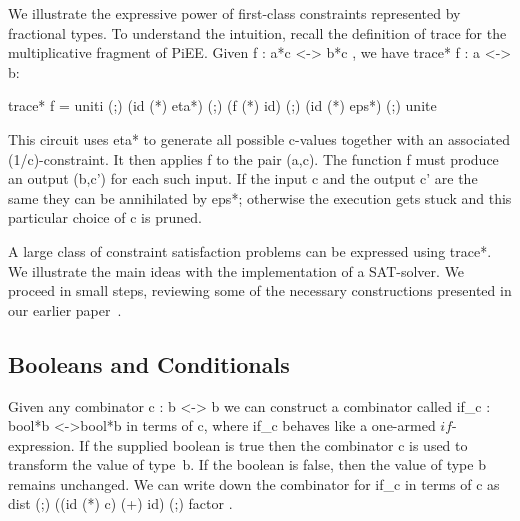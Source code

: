 \documentclass[preprint]{sigplanconf}
\begin{document}
We illustrate the expressive power of first-class constraints represented by
fractional types. To understand the intuition, recall the definition of
{{trace}} for the multiplicative fragment of {{PiEE}}. 
Given {{f : a*c <-> b*c }}, we have {{trace* f : a <-> b}}: 

{{ trace* f = uniti (;) (id (*) eta*) (;) (f (*) id) (;) (id (*) eps*) (;) unite }}

\noindent This circuit uses {{eta*}} to generate all possible {{c}}-values
together with an associated {{(1/c)}}-constraint. It then applies {{f}} to the
pair {{(a,c)}}. The function {{f}} must produce an output {{(b,c')}} for each
such input. If the input {{c}} and the output {{c'}} are the same they can be
annihilated by {{eps*}}; otherwise the execution gets stuck and this
particular choice of {{c}} is pruned. 


A large class of constraint satisfaction problems can be expressed
using {{trace*}}. We illustrate the main ideas with the implementation
of a SAT-solver.  We proceed in small steps, reviewing some of the
necessary constructions presented in our earlier
paper~\cite{infeffects}.

\subsection{Booleans and Conditionals} 

Given any combinator {{c : b <-> b}} we can construct a combinator called
{{if_c : bool*b <->bool*b}} in terms of {{c}}, where {{if_c}} behaves like a
one-armed $\mathit{if}$-expression. If the supplied boolean is {{true}} then
the combinator {{c}} is used to transform the value of type~{{b}}. If the
boolean is {{false}}, then the value of type {{b}} remains unchanged. We can
write down the combinator for {{if_c}} in terms of {{c}} as 
{{ dist (;) ((id (*) c) (+) id) (;) factor }}.
\end{document}
